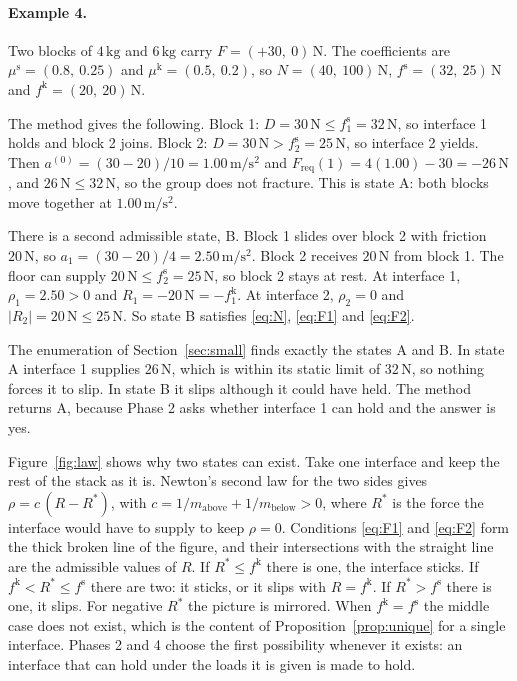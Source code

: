\documentclass[11pt,a4paper]{article}
\newcommand{\fs}{f^{\mathrm{s}}}
\newcommand{\fkin}{f^{\mathrm{k}}}
\newcommand{\mus}{\mu^{\mathrm{s}}}
\newcommand{\muk}{\mu^{\mathrm{k}}}
\newcommand{\Freq}{F_{\mathrm{req}}}
\begin{document}
\paragraph{Example 4.} Two blocks of $4\,\mathrm{kg}$ and $6\,\mathrm{kg}$ carry $F=(+30,\ 0)\,\mathrm{N}$. The coefficients are $\mus=(0.8,\ 0.25)$ and $\muk=(0.5,\ 0.2)$, so $N=(40,\ 100)\,\mathrm{N}$, $\fs=(32,\ 25)\,\mathrm{N}$ and $\fkin=(20,\ 20)\,\mathrm{N}$.

The method gives the following. Block 1: $D=30\,\mathrm{N}\le\fs_1=32\,\mathrm{N}$, so interface 1 holds and block 2 joins. Block 2: $D=30\,\mathrm{N}>\fs_2=25\,\mathrm{N}$, so interface 2 yields. Then $a^{(0)}=(30-20)/10=1.00\,\mathrm{m/s^2}$ and $\Freq(1)=4(1.00)-30=-26\,\mathrm{N}$, and $26\,\mathrm{N}\le32\,\mathrm{N}$, so the group does not fracture. This is state A: both blocks move together at $1.00\,\mathrm{m/s^2}$.

There is a second admissible state, B. Block 1 slides over block 2 with friction $20\,\mathrm{N}$, so $a_1=(30-20)/4=2.50\,\mathrm{m/s^2}$. Block 2 receives $20\,\mathrm{N}$ from block 1. The floor can supply $20\,\mathrm{N}\le\fs_2=25\,\mathrm{N}$, so block 2 stays at rest. At interface 1, $\rho_1=2.50>0$ and $R_1=-20\,\mathrm{N}=-\fkin_1$. At interface 2, $\rho_2=0$ and $|R_2|=20\,\mathrm{N}\le25\,\mathrm{N}$. So state B satisfies \eqref{eq:N}, \eqref{eq:F1} and \eqref{eq:F2}.

The enumeration of Section~\ref{sec:small} finds exactly the states A and B. In state A interface 1 supplies $26\,\mathrm{N}$, which is within its static limit of $32\,\mathrm{N}$, so nothing forces it to slip. In state B it slips although it could have held. The method returns A, because Phase 2 asks whether interface 1 can hold and the answer is yes.

Figure~\ref{fig:law} shows why two states can exist. Take one interface and keep the rest of the stack as it is. Newton's second law for the two sides gives $\rho=c\,(R-R^{*})$, with $c=1/m_{\text{above}}+1/m_{\text{below}}>0$, where $R^{*}$ is the force the interface would have to supply to keep $\rho=0$. Conditions \eqref{eq:F1} and \eqref{eq:F2} form the thick broken line of the figure, and their intersections with the straight line are the admissible values of $R$. If $R^{*}\le\fkin$ there is one, the interface sticks. If $\fkin<R^{*}\le\fs$ there are two: it sticks, or it slips with $R=\fkin$. If $R^{*}>\fs$ there is one, it slips. For negative $R^{*}$ the picture is mirrored. When $\fkin=\fs$ the middle case does not exist, which is the content of Proposition~\ref{prop:unique} for a single interface. Phases 2 and 4 choose the first possibility whenever it exists: an interface that can hold under the loads it is given is made to hold.
\end{document}
